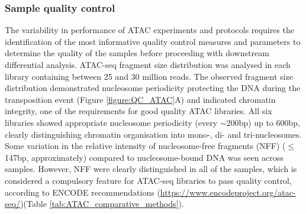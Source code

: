 \subsubsection{Sample quality control}
The variability in performance of ATAC experiments and protocols requires the identification of the most informative quality control measures and parameters to determine the quality of the samples before proceeding with downstream differential analysis. ATAC-seq fragment size distribution was analysed in each library containing between 25 and 30 million reads. The observed fragment size distribution demonstrated nucleosome periodicity protecting the DNA during the transposition event (Figure \ref{figure:QC_ATAC}A) and indicated chromatin integrity, one of the requirements for good quality ATAC libraries. All six libraries showed appropriate nucleosome periodicity (every $\sim$200bp) up to 600bp, clearly distinguishing chromatin organisation into mono-, di- and tri-nucleosomes. Some variation in the relative intensity of nucleosome-free fragments (NFF) ($\leq$147bp, approximately) compared to nucleosome-bound DNA was seen across samples. However, NFF were clearly distinguished in all of the samples, which is considered a compulsory feature for ATAC-seq libraries to pass quality control, according to ENCODE recommendations (\url{https://www.encodeproject.org/atac-seq/})(Table \ref{tab:ATAC_comparative_methods}).



